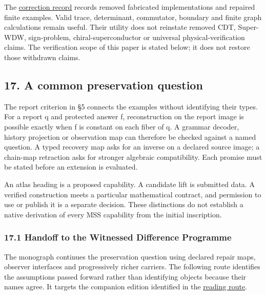 \documentclass[
  11pt,
]{article}
\begin{document}
The \href{docs/sources/architecture.txt}{correction record} records
removed fabricated implementations and repaired finite examples. Valid
trace, determinant, commutator, boundary and finite graph calculations
remain useful. Their utility does not reinstate removed CDT, Super-WDW,
sign-problem, chiral-superconductor or universal physical-verification
claims. The verification scope of this paper is stated below; it does
not restore those withdrawn claims.

\subsection{17. A common preservation
question}\label{a-common-preservation-question}

The report criterion in §5 connects the examples without identifying
their types. For a report q and protected answer f, reconstruction on
the report image is possible exactly when f is constant on each fiber of
q. A grammar decoder, history projection or observation map can
therefore be checked against a named question. A typed recovery map asks
for an inverse on a declared source image; a chain-map retraction asks
for stronger algebraic compatibility. Each promise must be stated before
an extension is evaluated.

An atlas heading is a proposed capability. A candidate lift is submitted
data. A verified construction meets a particular mathematical contract,
and permission to use or publish it is a separate decision. These
distinctions do not establish a native derivation of every MSS
capability from the initial inscription.

\subsubsection{17.1 Handoff to the Witnessed Difference
Programme}\label{handoff-to-the-witnessed-difference-programme}

The monograph continues the preservation question using declared repair
maps, observer interfaces and progressively richer carriers. The
following route identifies the assumptions passed forward rather than
identifying objects because their names agree. It targets the companion
edition identified in the \href{docs/monograph_route.md}{reading route}.
\end{document}
